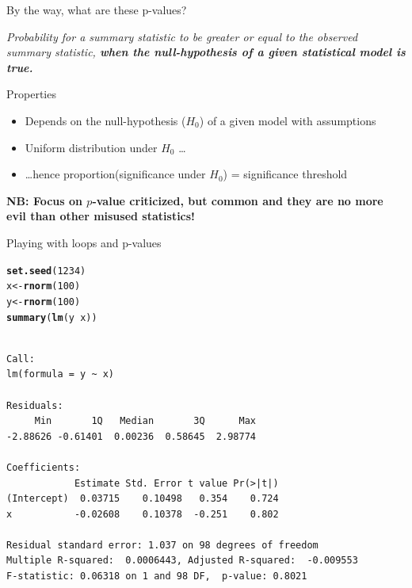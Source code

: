 \documentclass[10pt]{beamer}\usepackage[]{graphicx}\usepackage[]{color}
\makeatletter
\newcommand{\hlnum}[1]{\textcolor[rgb]{0.686,0.059,0.569}{#1}}%
\newcommand{\hlopt}[1]{\textcolor[rgb]{0,0,0}{#1}}%
\newcommand{\hlstd}[1]{\textcolor[rgb]{0.345,0.345,0.345}{#1}}%
\newcommand{\hlkwb}[1]{\textcolor[rgb]{0.69,0.353,0.396}{#1}}%
\newcommand{\hlkwd}[1]{\textcolor[rgb]{0.737,0.353,0.396}{\textbf{#1}}}%
\newenvironment{kframe}{%
 \def\at@end@of@kframe{}%
 \ifinner\ifhmode%
  \def\at@end@of@kframe{\end{minipage}}%
  \begin{minipage}{\columnwidth}%
 \fi\fi%
 \def\FrameCommand##1{\hskip\@totalleftmargin \hskip-\fboxsep
 \colorbox{shadecolor}{##1}\hskip-\fboxsep
     \hskip-\linewidth \hskip-\@totalleftmargin \hskip\columnwidth}%
 \MakeFramed {\advance\hsize-\width
   \@totalleftmargin\z@ \linewidth\hsize
   \@setminipage}}%
 {\par\unskip\endMakeFramed%
 \at@end@of@kframe}
\newenvironment{knitrout}{}{} %
\makeatother
\begin{document}
\begin{frame}{By the way, what are these p-values?}%

\textit{Probability for a summary statistic to be greater or equal to the observed summary statistic, \textbf{when the null-hypothesis of a given statistical model is true.}}

\pause

\begin{exampleblock}{Properties}
  \begin{itemize}
    \item Depends on the null-hypothesis ($H_0$) of a given model with assumptions
    \item Uniform distribution under $H_0$ \dots
    \item \dots hence proportion(significance under $H_0$) = significance threshold
  \end{itemize}
\end{exampleblock}

\pause
\textbf{NB: Focus on $p$-value criticized, but common and they are no more evil than other misused statistics!}
\end{frame}

\begin{frame}[fragile]{Playing with loops and p-values}

\begin{knitrout}
\color{fgcolor}\begin{kframe}
\begin{alltt}
\hlkwd{set.seed}\hlstd{(}\hlnum{1234}\hlstd{)}
\hlstd{x} \hlkwb{<-} \hlkwd{rnorm}\hlstd{(}\hlnum{100}\hlstd{)}
\hlstd{y} \hlkwb{<-} \hlkwd{rnorm}\hlstd{(}\hlnum{100}\hlstd{)}
\hlkwd{summary}\hlstd{(}\hlkwd{lm}\hlstd{(y}\hlopt{~}\hlstd{x))}
\end{alltt}
\begin{verbatim}

Call:
lm(formula = y ~ x)

Residuals:
     Min       1Q   Median       3Q      Max 
-2.88626 -0.61401  0.00236  0.58645  2.98774 

Coefficients:
            Estimate Std. Error t value Pr(>|t|)
(Intercept)  0.03715    0.10498   0.354    0.724
x           -0.02608    0.10378  -0.251    0.802

Residual standard error: 1.037 on 98 degrees of freedom
Multiple R-squared:  0.0006443,	Adjusted R-squared:  -0.009553 
F-statistic: 0.06318 on 1 and 98 DF,  p-value: 0.8021
\end{verbatim}
\end{kframe}
\end{knitrout}
\end{frame}
\end{document}
